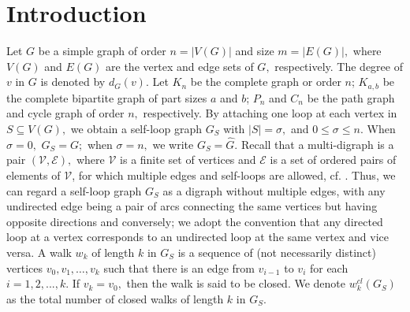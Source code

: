 \documentclass[12pt,a4paper,reqno]{amsart}
\numberwithin{equation}{section}
\theoremstyle{plain}
\theoremstyle{definition}
\newcommand{\<}{\langle}
\renewcommand{\>}{\rangle}
\begin{document}
\section{Introduction}
\label{sect1}
Let $G$ be a simple graph of order $n=|V(G)|$ and size $m=|E(G)|,$ where $V(G)$ and $E(G)$ are the vertex and edge sets of $G,$ respectively. The degree of $v$ in $G$ is denoted by $d_G(v).$  %
Let $K_n$ be the complete graph or order $n$; $K_{a,b}$ be the complete bipartite graph of part sizes $a$ and $b$; $P_n$ and $C_n$ be the path graph and cycle graph of order $n,$ respectively.  %
By attaching one loop at each vertex in $S \subseteq V(G),$ we obtain a self-loop graph $G_S$ with $|S|=\sigma,$ and $0\leq \sigma \leq n.$ When $\sigma=0,$ $G_S=G;$ when $\sigma=n,$ we write $G_S=\widehat{G}.$
Recall that a multi-digraph is a pair $(\mathscr{V},\mathscr{E}),$ where $\mathscr{V}$ is a finite set of vertices and $\mathscr{E}$ is a set of ordered pairs of elements of $\mathscr{V}$, for which multiple edges and self-loops are allowed, cf. \cite{cvetkovic1995spectra}. Thus, we can regard a self-loop graph $G_S$ as a digraph without multiple edges, with any undirected edge being a pair of arcs connecting the same vertices but having opposite directions and conversely; we adopt the convention that any directed loop at a vertex corresponds to an undirected loop at the same vertex and vice versa. A walk $w_k$ of length $k$ in $G_S$ is a sequence of (not necessarily distinct) vertices $v_0,v_1,\ldots, v_k$ such that there is an edge from $v_{i-1}$ to $v_i$ for each $i=1,2,...,k.$ If $v_k=v_0,$ then the walk is said to be closed. We denote $w_k^{cl}(G_S)$ as the total number of closed walks of length $k$ in $G_S.$
\end{document}

